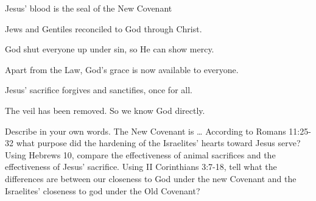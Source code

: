 \begin{discussion}



 Jesus' blood is the seal of the New Covenant

 Jews and Gentiles reconciled to God through Christ.


 God shut everyone up under sin, so He can show mercy.

 Apart from the Law, God's grace is now available to everyone.

 Jesus' sacrifice forgives and sanctifies, once for all.


 The veil has been removed.  So we know God directly.

\end{discussion}

\begin{questions}
\q Describe in your own words.  The New Covenant is \ldots
\q According to Romans 11:25-32 what purpose did the hardening of the Israelites' hearts toward Jesus serve?
\q Using Hebrews 10, compare the effectiveness of animal sacrifices and the effectiveness of Jesus' sacrifice.
\q Using II Corinthians 3:7-18, tell what the differences are between our closeness to God under the new Covenant and the Israelites' closeness to god under the Old Covenant?
\end{questions}